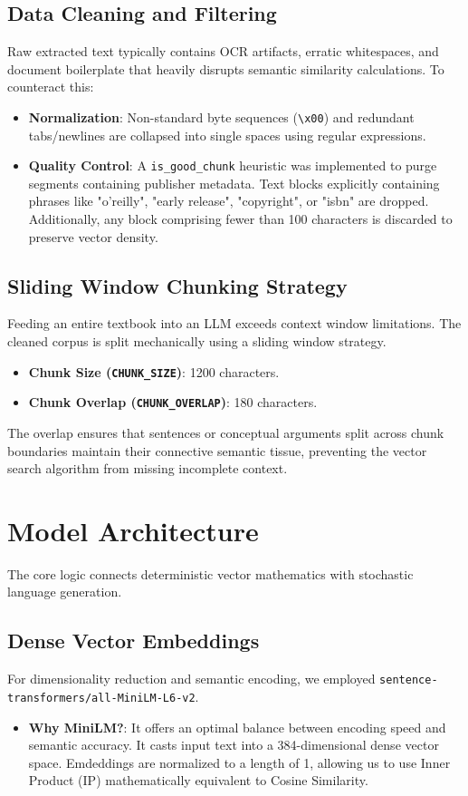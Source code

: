 \documentclass[12pt,a4paper]{article}
\begin{document}
\subsection{Data Cleaning and Filtering}
Raw extracted text typically contains OCR artifacts, erratic whitespaces, and document boilerplate that heavily disrupts semantic similarity calculations. To counteract this:
\begin{itemize}
    \item \textbf{Normalization}: Non-standard byte sequences (\texttt{\textbackslash x00}) and redundant tabs/newlines are collapsed into single spaces using regular expressions.
    \item \textbf{Quality Control}: A \texttt{is\_good\_chunk} heuristic was implemented to purge segments containing publisher metadata. Text blocks explicitly containing phrases like "o'reilly", "early release", "copyright", or "isbn" are dropped. Additionally, any block comprising fewer than 100 characters is discarded to preserve vector density.
\end{itemize}

\subsection{Sliding Window Chunking Strategy}
Feeding an entire textbook into an LLM exceeds context window limitations. The cleaned corpus is split mechanically using a sliding window strategy.
\begin{itemize}
    \item \textbf{Chunk Size (\texttt{CHUNK\_SIZE})}: 1200 characters.
    \item \textbf{Chunk Overlap (\texttt{CHUNK\_OVERLAP})}: 180 characters.
\end{itemize}
The overlap ensures that sentences or conceptual arguments split across chunk boundaries maintain their connective semantic tissue, preventing the vector search algorithm from missing incomplete context.

\section{Model Architecture}
The core logic connects deterministic vector mathematics with stochastic language generation.

\subsection{Dense Vector Embeddings}
For dimensionality reduction and semantic encoding, we employed \texttt{sentence-transformers/all-MiniLM-L6-v2}. 
\begin{itemize}
    \item \textbf{Why MiniLM?}: It offers an optimal balance between encoding speed and semantic accuracy. It casts input text into a 384-dimensional dense vector space. Emdeddings are normalized to a length of 1, allowing us to use Inner Product (IP) mathematically equivalent to Cosine Similarity.
\end{itemize}
\end{document}
